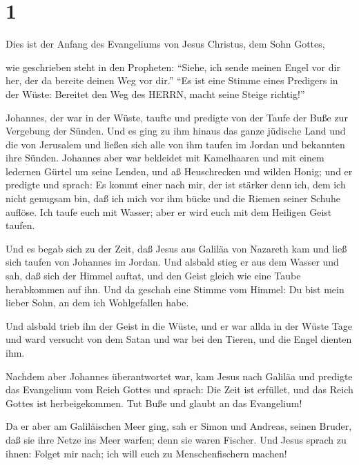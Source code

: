 \hypertarget{section}{%
\section{1}\label{section}}

 Dies ist der Anfang des Evangeliums von Jesus Christus, dem
Sohn Gottes,

 wie geschrieben steht in den Propheten: ``Siehe, ich sende
meinen Engel vor dir her, der da bereite deinen Weg vor dir.''
 ``Es ist eine Stimme eines Predigers in der Wüste: Bereitet
den Weg des HERRN, macht seine Steige richtig!''

 Johannes, der war in der Wüste, taufte und predigte von der
Taufe der Buße zur Vergebung der Sünden.  Und es ging zu ihm
hinaus das ganze jüdische Land und die von Jerusalem und ließen sich
alle von ihm taufen im Jordan und bekannten ihre Sünden. 
Johannes aber war bekleidet mit Kamelhaaren und mit einem ledernen
Gürtel um seine Lenden, und aß Heuschrecken und wilden Honig;
 und er predigte und sprach: Es kommt einer nach mir, der
ist stärker denn ich, dem ich nicht genugsam bin, daß ich mich vor ihm
bücke und die Riemen seiner Schuhe auflöse.  Ich taufe euch
mit Wasser; aber er wird euch mit dem Heiligen Geist taufen.

 Und es begab sich zu der Zeit, daß Jesus aus Galiläa von
Nazareth kam und ließ sich taufen von Johannes im Jordan. 
Und alsbald stieg er aus dem Wasser und sah, daß sich der Himmel auftat,
und den Geist gleich wie eine Taube herabkommen auf ihn. 
Und da geschah eine Stimme vom Himmel: Du bist mein lieber Sohn, an dem
ich Wohlgefallen habe.

 Und alsbald trieb ihn der Geist in die Wüste,
 und er war allda in der Wüste Tage und ward versucht von
dem Satan und war bei den Tieren, und die Engel dienten ihm.

 Nachdem aber Johannes überantwortet war, kam Jesus nach
Galiläa und predigte das Evangelium vom Reich Gottes  und
sprach: Die Zeit ist erfüllet, und das Reich Gottes ist herbeigekommen.
Tut Buße und glaubt an das Evangelium!

 Da er aber am Galiläischen Meer ging, sah er Simon und
Andreas, seinen Bruder, daß sie ihre Netze ins Meer warfen; denn sie
waren Fischer.  Und Jesus sprach zu ihnen: Folget mir nach;
ich will euch zu Menschenfischern machen!

